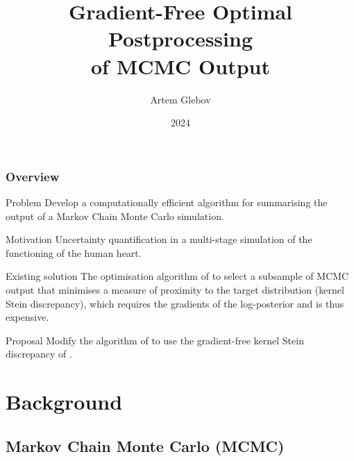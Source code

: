 \documentclass{beamer}
\title[Gradient-Free Optimal Postprocessing]{Gradient-Free Optimal Postprocessing \\ of MCMC Output}
\author{Artem Glebov}
\institute{King's College London}
\date{2024}
\begin{document}
\frame{\titlepage}

\begin{frame}
\frametitle{Overview}

 \begin{block}{Problem}
	Develop a computationally efficient algorithm for summarising the output of a Markov Chain Monte Carlo simulation.
 \end{block}
 
 \bigskipamount
 
 \begin{block}{Motivation}
	Uncertainty quantification in a multi-stage simulation of the functioning of the human heart.
 \end{block}
 
 \bigskipamount
 
 \begin{block}{Existing solution}
	The optimisation algorithm of \cite{riabizOptimalThinningMCMC2022} to select a subsample of MCMC output that minimises a measure of proximity to the target distribution (kernel Stein discrepancy), which requires the gradients of the log-posterior and is thus expensive.
 \end{block}
 
 \bigskipamount
 
 \begin{block}{Proposal}
	Modify the algorithm of \cite{riabizOptimalThinningMCMC2022} to use the gradient-free kernel Stein discrepancy of \cite{fisherGradientFreeKernelStein2024}.
 \end{block}

\end{frame}

\section{Background}

\subsection{Markov Chain Monte Carlo (MCMC)}
\end{document}
